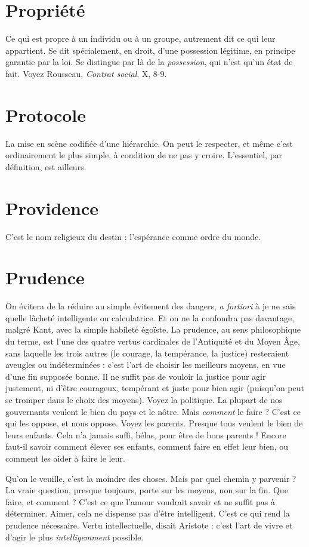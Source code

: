 \section{Propriété}
Ce qui est propre à un individu ou à un groupe, autrement dit
ce qui leur appartient. Se dit spécialement, en droit, d’une
possession légitime, en principe garantie par la loi. Se distingue par là de la {\it possession},
qui n’est qu'un état de fait. Voyez Rousseau, {\it Contrat social}, X, 8-9.

\section{Protocole}
La mise en scène codifiée d’une hiérarchie. On peut le respecter,
et même c’est ordinairement le plus simple, à condition
de ne pas y croire. L'essentiel, par définition, est ailleurs.

\section{Providence}
C'est le nom religieux du destin : l’espérance comme ordre
du monde.

\section{Prudence}
On évitera de la réduire au simple évitement des dangers,
{\it a fortiori} à je ne sais quelle lâcheté intelligente ou calculatrice.
Et on ne la confondra pas davantage, malgré Kant, avec la simple habileté
égoïste. La prudence, au sens philosophique du terme, est l’une des quatre
vertus cardinales de l'Antiquité et du Moyen Âge, sans laquelle les trois autres
(le courage, la tempérance, la justice) resteraient aveugles ou indéterminées :
c’est l’art de choisir les meilleurs moyens, en vue d’une fin supposée bonne. Il
ne suffit pas de vouloir la justice pour agir justement, ni d’être courageux, tempérant
et juste pour bien agir (puisqu'on peut se tromper dans le choix des
moyens). Voyez la politique. La plupart de nos gouvernants veulent le bien du
pays et le nôtre. Mais {\it comment} le faire ? C’est ce qui les oppose, et nous oppose.
Voyez les parents. Presque tous veulent le bien de leurs enfants. Cela n’a jamais
suffi, hélas, pour être de bons parents ! Encore faut-il savoir comment élever ses
enfants, comment faire en effet leur bien, ou comment les aider à faire le leur.

Qu’on le veuille, c’est la moindre des choses. Mais par quel chemin y parvenir ?
La vraie question, presque toujours, porte sur les moyens, non sur la fin. Que
faire, et comment ? C’est ce que l’amour voudrait savoir et ne suffit pas à déterminer.
Aimer, cela ne dispense pas d’être intelligent. C’est ce qui rend la prudence
nécessaire. Vertu intellectuelle, disait Aristote : c’est l’art de vivre et
d’agir le plus {\it intelligemment} possible.

